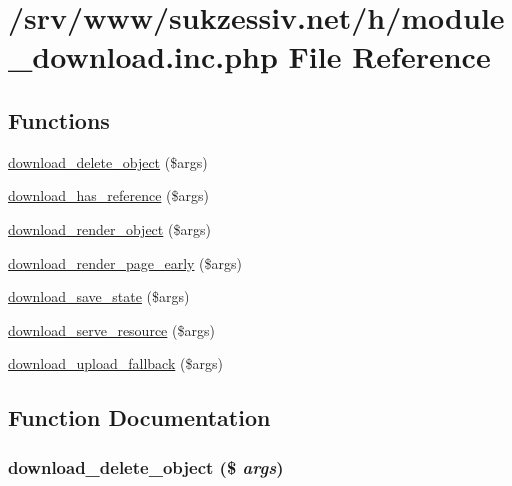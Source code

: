 \hypertarget{module__download_8inc_8php}{
\section{/srv/www/sukzessiv.net/h/module\_\-download.inc.php File Reference}
\label{module__download_8inc_8php}
}
\subsection*{Functions}
\begin{CompactItemize}
\item 
\hyperlink{module__download_8inc_8php_5fd781bf1e0393667b227abec7169b28}{download\_\-delete\_\-object} (\$args)
\item 
\hyperlink{module__download_8inc_8php_a80da3f3fd41f7f00f97043f7a2431c8}{download\_\-has\_\-reference} (\$args)
\item 
\hyperlink{module__download_8inc_8php_57c588f1fd0663aa16fd707a522bcc79}{download\_\-render\_\-object} (\$args)
\item 
\hyperlink{module__download_8inc_8php_c980246bec838c65efd59bc25253b005}{download\_\-render\_\-page\_\-early} (\$args)
\item 
\hyperlink{module__download_8inc_8php_2e9ee6868b80832b40e9072a8c644c88}{download\_\-save\_\-state} (\$args)
\item 
\hyperlink{module__download_8inc_8php_930c9545346e8da3f3db5a97dc4d8c74}{download\_\-serve\_\-resource} (\$args)
\item 
\hyperlink{module__download_8inc_8php_678bcaf9018d772881b4291020894fa0}{download\_\-upload\_\-fallback} (\$args)
\end{CompactItemize}


\subsection{Function Documentation}
\hypertarget{module__download_8inc_8php_5fd781bf1e0393667b227abec7169b28}{
\subsubsection[{download\_\-delete\_\-object}]{\setlength{\rightskip}{0pt plus 5cm}download\_\-delete\_\-object (\$ {\em args})}}
\label{module__download_8inc_8php_5fd781bf1e0393667b227abec7169b28}


